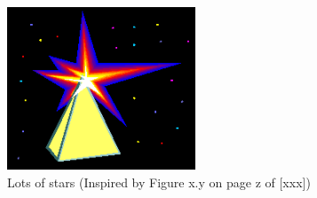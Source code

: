 \begin{figure}[!ht]
    \begin{center}
        \includegraphics[width=0.5\textwidth]{content/figures/assets/lots_of_stars.png}
    \end{center}
    \caption{Lots of stars  (Inspired by Figure x.y on page z of [xxx])}
    \label{fig:lotsofstars}
\end{figure}
